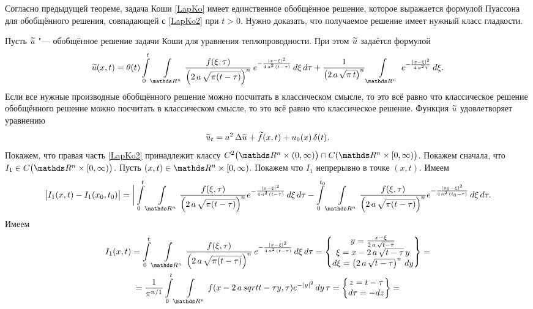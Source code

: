 \begin{Proof}
Согласно предыдущей теореме, задача Коши \eqref{LapKo} имеет единственное обобщённое решение, которое выражается формулой Пуассона для обобщённого решения, совпадающей с \eqref{LapKo2} при $t>0$. Нужно доказать, что получаемое решение имеет нужный класс гладкости.

Пусть $\widetilde{u}{}$ "--- обобщённое решение задачи Коши для уравнения теплопроводности. При этом $\widetilde{u}{}$ задаётся формулой
\[
  \Til u(x,t) =\theta(t)
    \int\limits_0^t\Gint{\R^n}\frac{f(\xi,\tau)}{\left(2\,a\,\sqrt{\pi(t-\tau)}\right)^n}\,e^{-\frac{|x-\xi|^2}{4\,a^2\,(t-\tau)}}\,d\xi\,d\tau + 
    \frac1{\left(2\,a\,\sqrt{\pi\,t}\right)^n}\Gint{\R^n}\,e^{-\frac{|x-\xi|^2}{4\,a^2\,t}}\,d\xi.
\]
Если все нужные производные обобщённого решение можно посчитать в классическом смысле, то это всё равно что классическое решение обобщённого решение можно посчитать в классическом смысле, то это всё равно что классическое решение. Функция $\widetilde{u}{}$ удовлетворяет уравнению
\[
  \widetilde{u}{}_t = a^2\,\Delta\widetilde{u}{} + \widetilde{f}{}(x,t) + u_0(x)\,\delta(t).
\]
Покажем, что правая часть \eqref{LapKo2} принадлежит классу $C^2\big(\R^n\times(0,\infty)\big)\cap C(\R^n\times[0,\infty)\big)$. Покажем сначала, что $I_1\in C\big(\R^n\times[0,\infty)\big)$. Пусть $(x,t)\in\R^n\times[0,\infty)$. Покажем что $I_1$ непрерывно в точке $(x,t)$. Имеем
\[
  \big|I_1(x,t) - I_1(x_0,t_0)\big| =
  \bigg|
    \int\limits_0^t
    \Gint{\R^n}\frac{f(\xi,\tau)}{\left(2\,a\,\sqrt{\pi(t-\tau)}\right)^n} e^{-\frac{|x-\xi|^2}{4\,a^2\,(t-\tau)}}\,d\xi\,d\tau
    -\int\limits_0^{t_0}
    \Gint{\R^n}\frac{f(\xi,\tau)}{\left(2\,a\,\sqrt{\pi(t-\tau)}\right)^n} e^{-\frac{|x_0-\xi|^2}{4\,a^2\,(t_0-\tau)}}\,d\xi\,d\tau.
\]
Имеем
\begin{multline*}
 I_1(x,t) = 
\int\limits_0^t\Gint{\R^n}\frac{f(\xi,\tau)}{\left(2\,a\,\sqrt{\pi(t-\tau)}\right)^n}\,e^{-\frac{|x-\xi|^2}{4\,a^2\,(t-\tau)}}\,d\xi\,d\tau
= \left\{
  \begin{matrix}
  y = \frac{x-\xi}{2\,a\,\sqrt{t-\tau}}\\
  \xi = x-2\,a\,\sqrt{t-\tau}\,y\\
  d\xi = \left(2\,a\,\sqrt{t-\tau}\right)^n\,dy
  \end{matrix}\right\}=\\=
  \frac1{\pi^{n/1}}\int\limits_0^t\Gint{\R^n} f(x-2\,a\,sqrt{t-\tau}y,\tau)e^{-|y|^2}\,dy\,\tau = 
  \left\{\begin{matrix}
    z = t-\tau\\
    d\tau = -dz
\end{matrix}\right\} =

\end{multline*}
\end{Proof}
